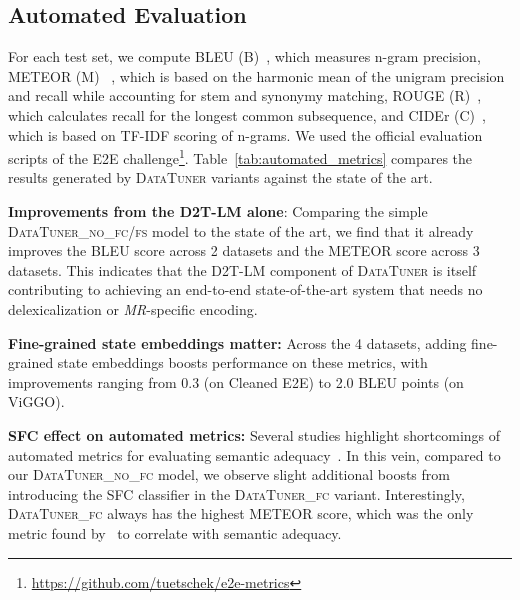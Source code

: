 \documentclass[11pt]{article}
\newcommand{\viggo}{ViGGO\xspace}
\newcommand{\cleanedee}{Cleaned E2E\xspace}
\newcommand{\system}{\textsc{DataTuner}\xspace}
\newcommand{\systemFcPost}{\textsc{DataTuner\_fc}\xspace}
\newcommand{\systemNoFc}{\textsc{DataTuner\_no\_fc}\xspace}
\newcommand{\systemNoFcNoFs}{\textsc{DataTuner\_no\_fc/fs}\xspace}
\newcommand{\numData}{4\xspace}
\newcommand{\dtlm}{\textsc{D2T-LM}\xspace}
\newcommand{\sfc}{SFC\xspace}
\newcommand{\mr}{\textit{MR}\xspace}
\theoremstyle{definition}
\theoremstyle{break}
\begin{document}
\subsection{Automated Evaluation}

For each test set, we compute BLEU (B)~\cite{papineni2002bleu}, which measures n-gram precision, METEOR (M) ~\cite{lavie2007meteor}, which is based on the harmonic mean of the unigram precision and recall while accounting for stem and synonymy matching, ROUGE (R)~\cite{lin2004rouge}, which calculates recall for the longest common subsequence, and CIDEr (C)~\cite{vedantam2015cider}, which is based on TF-IDF scoring of n-grams. 
We used the official evaluation scripts of the E2E challenge\footnote{\url{https://github.com/tuetschek/e2e-metrics}}. 
Table~\ref{tab:automated_metrics} compares the results generated by \system variants against the state of the art.

\textbf{Improvements from the \dtlm alone}: Comparing the simple \systemNoFcNoFs model to the state of the art, we find that it already improves the BLEU score across 2 datasets and the METEOR score across 3 datasets. 
This indicates that the \dtlm component of \system is itself contributing to achieving an end-to-end state-of-the-art system that needs no delexicalization or \mr-specific encoding.

\textbf{Fine-grained state embeddings matter:} Across the \numData datasets, adding fine-grained state embeddings boosts performance on these metrics, with improvements ranging from 0.3 (on \cleanedee) to 2.0 BLEU points (on \viggo).

\textbf{\sfc effect on automated metrics:} 
Several studies highlight shortcomings of automated metrics for evaluating semantic adequacy~\cite{novikova-etal-2017-need,shimorina2018human}. In this vein, compared to our \systemNoFc model, we observe slight additional 
boosts from introducing the \sfc classifier in the \systemFcPost variant. Interestingly, \systemFcPost always has the highest METEOR score, which was the only metric found by~ to correlate with semantic adequacy.
\end{document}
